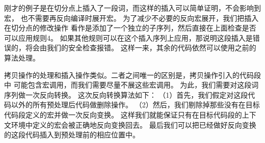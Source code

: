 刚才的例子是在切分点上插入了一段词，而这样的插入可以简单证明，不会影响到宏，
也不需要再反向编译时展开宏。
为了减少不必要的反向宏展开，我们把插入在切分点的修改操作
看作是添加了一个独立的子序列，然后直接在上面检查是否可以应用规则4。
如果其他规则可以在这个插入序列上应用，那说明这段插入是错误的，将会由我们的安全检查报错。
这样一来，其余的代码依然可以使用之前的算法处理。

拷贝操作的处理和插入操作类似。二者之间唯一的区别是，拷贝操作引入的代码段中
可能包含宏调用，而我们需要尽量不展这些宏调用。
为此，我们需要对这段词序列做一次反向转换。
这次反向转换算法如下：
（1）首先，我们假定对这段代码以外的所有预处理后代码做删除操作。
（2）然后，我们剔除掉那些没有在目标代码段定义的宏并做一次反向变换。
这样我们就能保证只有在目标代码段的上下文环境中定义的宏会被正确地反向变换回去。
最后我们可以把已经做好反向变换的这段代码插入到预处理前的相应位置中。







